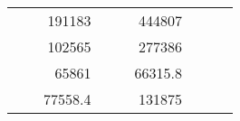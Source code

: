 \begin{table}[]
\begin{tabular}{|ccrccrccc}
\multicolumn{1}{|c|}{\cellcolor[HTML]{FFFFC7}}                                & \multicolumn{1}{c|}{\cellcolor[HTML]{DDFDFF}}                      & \multicolumn{1}{r|}{\cellcolor[HTML]{DAE8FC}191183}    & \multicolumn{1}{c|}{\cellcolor[HTML]{FFFFC7}}                                & \multicolumn{1}{c|}{\cellcolor[HTML]{DDFDFF}}                       & \multicolumn{1}{r|}{\cellcolor[HTML]{DDFDFF}444807}    &                                                                              &                                                                    &                                                        \\ \cline{3-3} \cline{6-6}
\multicolumn{1}{|c|}{\cellcolor[HTML]{FFFFC7}}                                & \multicolumn{1}{c|}{\cellcolor[HTML]{DDFDFF}}                      & \multicolumn{1}{r|}{\cellcolor[HTML]{DDFDFF}102565}    & \multicolumn{1}{c|}{\cellcolor[HTML]{FFFFC7}}                                & \multicolumn{1}{c|}{\cellcolor[HTML]{DDFDFF}}                       & \multicolumn{1}{r|}{\cellcolor[HTML]{DAE8FC}277386}    &                                                                              &                                                                    &                                                        \\ \cline{3-3} \cline{6-6}
\multicolumn{1}{|c|}{\cellcolor[HTML]{FFFFC7}}                                & \multicolumn{1}{c|}{\cellcolor[HTML]{DDFDFF}}                      & \multicolumn{1}{r|}{\cellcolor[HTML]{DAE8FC}65861}     & \multicolumn{1}{c|}{\cellcolor[HTML]{FFFFC7}}                                & \multicolumn{1}{c|}{\cellcolor[HTML]{DDFDFF}}                       & \multicolumn{1}{r|}{\cellcolor[HTML]{DDFDFF}66315.8}   &                                                                              &                                                                    &                                                        \\ \cline{3-3} \cline{6-6}
\multicolumn{1}{|c|}{\cellcolor[HTML]{FFFFC7}}                                & \multicolumn{1}{c|}{\cellcolor[HTML]{DDFDFF}}                      & \multicolumn{1}{r|}{\cellcolor[HTML]{DDFDFF}77558.4}   & \multicolumn{1}{c|}{\cellcolor[HTML]{FFFFC7}}                                & \multicolumn{1}{c|}{\cellcolor[HTML]{DDFDFF}}                       & \multicolumn{1}{r|}{\cellcolor[HTML]{DAE8FC}131875}    &                                                                              &                                                                    &                                                        \\ \cline{3-3} \cline{6-6}

\end{tabular}
\end{table}
